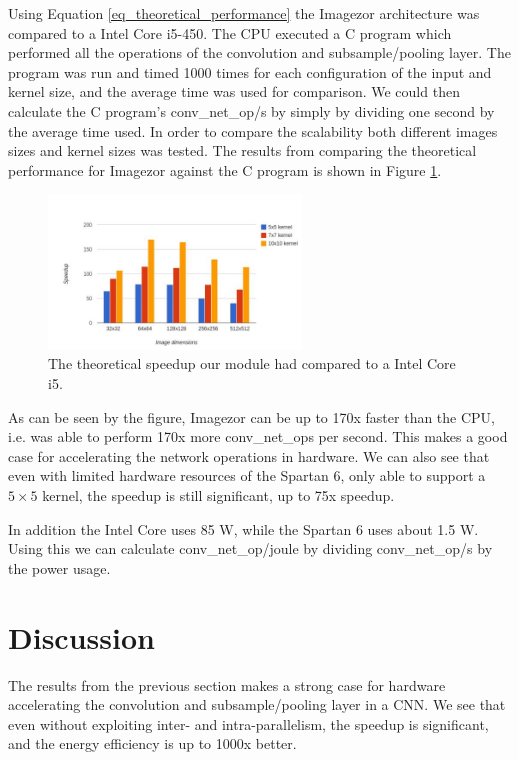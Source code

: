 Using Equation \ref{eq_theoretical_performance} the Imagezor architecture was  compared  to a Intel Core i5-450. The CPU executed a C program which performed all the operations of the convolution and subsample/pooling layer. The program was run and timed 1000 times for each configuration of the input and kernel size, and the average time was used for comparison. We could then calculate the C program's conv\_net\_op/s by simply by dividing one second by the average time used.  In order to compare the scalability both different images sizes and kernel sizes was tested. The results from comparing the theoretical performance for Imagezor against the C program is shown in Figure \ref{fig_cpu_cmp_results}.
\begin{figure}
  \centering
      \includegraphics[width=0.6\textwidth]{Figures/Results/Speedup_chart}
  \caption{The theoretical speedup our module had compared to a Intel Core i5.}
  \label{fig_cpu_cmp_results}
\end{figure}

As can be seen by the figure, Imagezor can be up to 170x faster than the CPU, i.e. was able to perform 170x more conv\_net\_ops per second. This makes a good case for accelerating the network operations in hardware. We can also see that even with limited hardware resources of the Spartan 6, only able to support a $ 5 \times 5 $ kernel, the speedup is still significant, up to 75x speedup.

In addition the Intel Core uses 85 W, while the Spartan 6 uses about 1.5 W. Using this we can calculate conv\_net\_op/joule by dividing conv\_net\_op/s by the power usage. 

\section{Discussion}

The results from the previous section makes a strong case for hardware accelerating the convolution and subsample/pooling layer in a CNN. We see that even without exploiting inter- and intra-parallelism, the speedup is significant, and the energy efficiency is up to 1000x better. 

